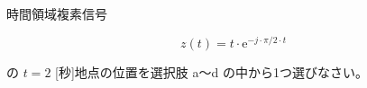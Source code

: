 時間領域複素信号 

\[
z(t) = t \cdot \textrm{e}^{-j \cdot \pi / 2 \cdot t}
\]

\medskip
\noindent の $t = 2$ [秒]地点の位置を選択肢 a〜d の中から1つ選びなさい。
